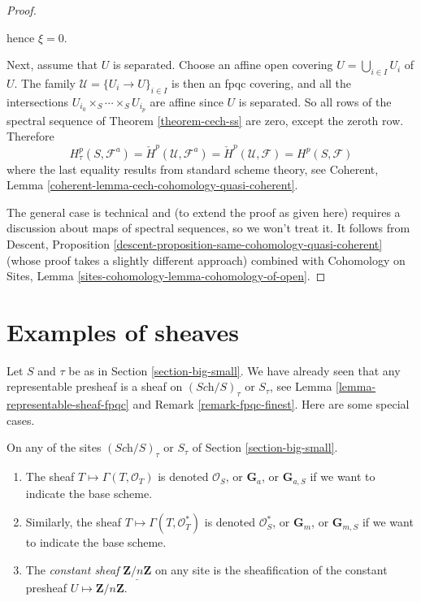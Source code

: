\begin{proof}
\begin{enumerate}
hence $\xi = 0$.
\end{enumerate}
Next, assume that $U$ is separated. Choose an affine open covering
$U = \bigcup_{i \in I} U_i$ of $U$. The family
$\mathcal{U} = \{U_i \to U\}_{i \in I}$ is then an fpqc covering,
and all the intersections
$U_{i_0} \times_S \cdots \times_S U_{i_p}$ are affine
since $U$ is separated. So all rows of the spectral sequence of
Theorem \ref{theorem-cech-ss}
are zero, except the zeroth row. Therefore
$$
H^p_\tau(S, \mathcal{F}^a) =
\check H^p(\mathcal{U}, \mathcal{F}^a) =
\check H^p(\mathcal{U}, \mathcal{F}) = H^p(S, \mathcal{F})
$$
where the last equality results from standard scheme theory, see
Coherent, Lemma \ref{coherent-lemma-cech-cohomology-quasi-coherent}.

\medskip\noindent
The general case is technical and (to extend the proof as given here)
requires a discussion about maps of spectral sequences, so we won't treat it.
It follows from
Descent, Proposition \ref{descent-proposition-same-cohomology-quasi-coherent}
(whose proof takes a slightly different approach) combined with
Cohomology on Sites, Lemma \ref{sites-cohomology-lemma-cohomology-of-open}.
\end{proof}





\section{Examples of sheaves}
\label{section-examples-sheaves}

\noindent
Let $S$ and $\tau$ be as in Section \ref{section-big-small}.
We have already seen that any representable presheaf is a sheaf on
$(\textit{Sch}/S)_\tau$ or $S_\tau$, see
Lemma \ref{lemma-representable-sheaf-fpqc}
and
Remark \ref{remark-fpqc-finest}.
Here are some special cases.

\begin{definition}
\label{definition-additive-sheaf}
On any of the sites $(\textit{Sch}/S)_\tau$ or $S_\tau$ of
Section \ref{section-big-small}.
\begin{enumerate}
\item The sheaf $T \mapsto \Gamma(T, \mathcal{O}_T)$ is denoted
$\mathcal{O}_S$, or $\mathbf{G}_a$, or $\mathbf{G}_{a, S}$ if we
want to indicate the base scheme.
\item Similarly, the sheaf
$T \mapsto \Gamma(T, \mathcal{O}^*_T)$ is denoted $\mathcal{O}_S^*$, or
$\mathbf{G}_m$, or $\mathbf{G}_{m, S}$ if we want
to indicate the base scheme.
\item The {\it constant sheaf} $\underline{\mathbf{Z}/n\mathbf{Z}}$ on any
site is the sheafification of the constant presheaf
$U \mapsto \mathbf{Z}/n\mathbf{Z}$.
\end{enumerate}
\end{definition}

